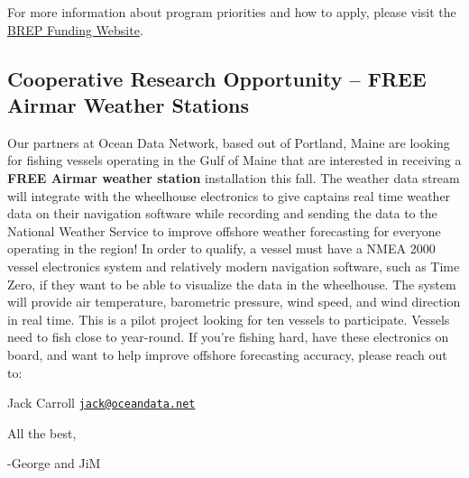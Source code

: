 \documentclass[
]{article}
\begin{document}
For more information about program priorities and how to apply, please
visit the
\href{https://www.fisheries.noaa.gov/grant/bycatch-reduction-engineering-program-funding}{BREP
Funding Website}.

\hypertarget{cooperative-research-opportunity-free-airmar-weather-stations}{%
\subsection{Cooperative Research Opportunity -- FREE Airmar Weather
Stations}\label{cooperative-research-opportunity-free-airmar-weather-stations}}

Our partners at Ocean Data Network, based out of Portland, Maine are
looking for fishing vessels operating in the Gulf of Maine that are
interested in receiving a \textbf{FREE Airmar weather station}
installation this fall. The weather data stream will integrate with the
wheelhouse electronics to give captains real time weather data on their
navigation software while recording and sending the data to the National
Weather Service to improve offshore weather forecasting for everyone
operating in the region! In order to qualify, a vessel must have a NMEA
2000 vessel electronics system and relatively modern navigation
software, such as Time Zero, if they want to be able to visualize the
data in the wheelhouse. The system will provide air temperature,
barometric pressure, wind speed, and wind direction in real time. This
is a pilot project looking for ten vessels to participate. Vessels need
to fish close to year-round. If you're fishing hard, have these
electronics on board, and want to help improve offshore forecasting
accuracy, please reach out to:

Jack Carroll
\href{mailto:jack@oceandata.net}{\nolinkurl{jack@oceandata.net}}

All the best,

-George and JiM
\end{document}
